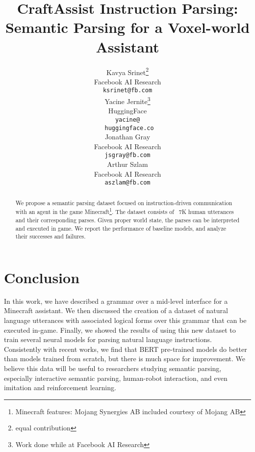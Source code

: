 \documentclass[11pt,a4paper]{article}
\title{CraftAssist Instruction Parsing: Semantic Parsing for a Voxel-world Assistant}
\author{Kavya Srinet\thanks{ equal contribution} \\
  Facebook AI Research  \\
  {\texttt{ksrinet@fb.com} }\\\And
  Yacine Jernite\printfnsymbol{1}\thanks{Work done while at Facebook AI Research} \\
  HuggingFace  \\ 
  {\texttt{yacine@}}\\
  {\texttt{ huggingface.co} }\\\And
  Jonathan Gray \\
  Facebook AI Research  \\
  {\texttt{jsgray@fb.com}} \\\And
  Arthur Szlam \\
  Facebook AI Research  \\
  {\texttt{aszlam@fb.com} }\\}
\date{}
\begin{document}
\maketitle
\begin{abstract}
We propose a semantic parsing dataset focused on instruction-driven communication with an agent in the game Minecraft\footnote{Minecraft features: \textcopyright Mojang Synergies AB included courtesy of Mojang AB}.  
The dataset consists of 
 ~7K human utterances and their corresponding parses.  Given proper world state, the parses can be interpreted and executed in game. 
We report the performance of baseline models, and analyze their successes and failures.
\end{abstract}








\section{Conclusion}
In this work, we have described a grammar over a mid-level interface for a Minecraft assistant. We then discussed the creation of a dataset of natural language utterances with associated logical forms over this grammar that can be executed in-game. Finally, we showed the results of using this new dataset to train several neural models for parsing natural language instructions.  %
Consistently with recent works, we find that BERT pre-trained models do better than models trained from scratch, but there is much space for improvement.
We believe this data will be useful to researchers studying semantic parsing, especially interactive semantic parsing, human-robot interaction, and even imitation and reinforcement learning.  



\end{document}
